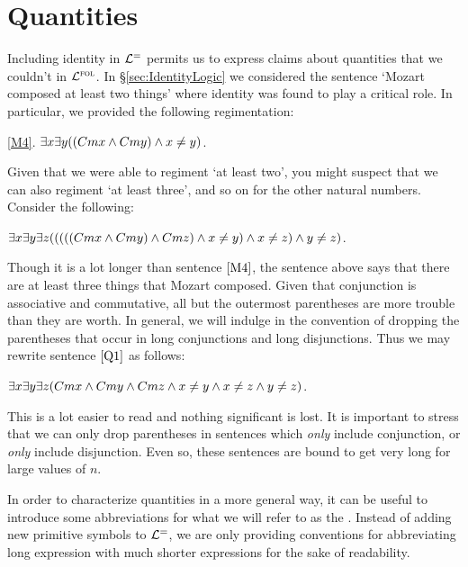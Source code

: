 \section{Quantities}
  \label{sec:Quantities}

Including identity in $\mathcal{L}^{=}$ permits us to express claims about quantities that we couldn't in $\mathcal{L}^{\textsc{fol}}$.
In \S\ref{sec:IdentityLogic} we considered the sentence `Mozart composed at least two things' where identity was found to play a critical role.
In particular, we provided the following regimentation:

\begin{earg}
  \item[\ref{M4}.] $\exists x\exists y((Cmx \wedge Cmy) \wedge x\neq y)$.
\end{earg}

Given that we were able to regiment `at least two', you might suspect that we can also regiment `at least three', and so on for the other natural numbers.
Consider the following:

\begin{earg}
  \item[\ex{Q1}] $\exists x\exists y\exists z(((((Cmx \wedge Cmy) \wedge Cmz) \wedge x\neq y) \wedge x\neq z) \wedge y\neq z)$.
\end{earg}

Though it is a lot longer than sentence $\ref{M4}$, the sentence above says that there are at least three things that Mozart composed.
Given that conjunction is associative and commutative, all but the outermost parentheses are more trouble than they are worth.
In general, we will indulge in the convention of dropping the parentheses that occur in long conjunctions and long disjunctions.
Thus we may rewrite sentence $\ref{Q1}$ as follows:

\begin{earg}
  \item[\ex{Q2}] $\exists x\exists y\exists z(Cmx \wedge Cmy \wedge Cmz \wedge x\neq y \wedge x\neq z \wedge y\neq z)$.
\end{earg}

This is a lot easier to read and nothing significant is lost.
It is important to stress that we can only drop parentheses in sentences which \textit{only} include conjunction, or \textit{only} include disjunction.
Even so, these sentences are bound to get very long for large values of $n$.

In order to characterize quantities in a more general way, it can be useful to introduce some abbreviations for what we will refer to as the .
Instead of adding new primitive symbols to $\mathcal{L}^{=}$, we are only providing conventions for abbreviating long expression with much shorter expressions for the sake of readability.


